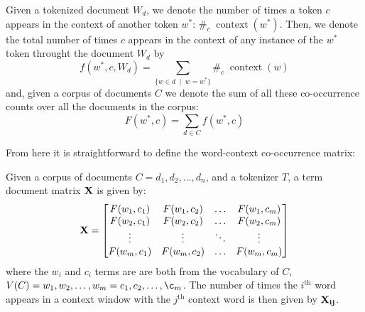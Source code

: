 \begin{definition}
  Given a tokenized document $W_d$, we denote the number of times a token $c$ appears in the context of another token $w^*$: $\#_c\;\operatorname{context}(w^*)$. Then, we denote the total number of times $c$ appears in the context of any instance of the $w^*$ token throught the document $W_d$ by
  \begin{equation}
    f(w^*,c,W_d)=\sum_{\{w\in d\;\mid\; w=w^*\}}\#_c\;\operatorname{context}(w)
  \end{equation}
  and, given a corpus of documents $C$ we denote the sum of all these co-occurrence counts over all the documents in the corpus:
  \begin{equation}
    F(w^*,c)=\sum_{d\in C}f(w^*,c)
  \end{equation}
\end{definition}

From here it is straightforward to define the word-context co-occurrence matrix:

\begin{definition}
  Given a corpus of documents $C=d_1,d_2,\dots,d_n$, and a tokenizer $T$, a term document matrix $\bf{X}$ is given by:
  \begin{equation}
    \bf{X}=
  \begin{bmatrix}
    F(w_1,c_1) & F(w_1,c_2) & \dots  & F(w_1,c_m) \\
    F(w_2,c_1) & F(w_2,c_2) & \dots  & F(w_2,c_m) \\
    \vdots        & \vdots        & \ddots & \vdots          \\
    F(w_m,c_1) & F(w_m,c_2) & \dots  & F(w_m,c_m) \\
  \end{bmatrix}
  \end{equation}
  where the $w_i$ and $c_i$ terms are are both from the vocabulary of $C$, $V(C)=w_1,w_2,\dots,w_m=c_1,c_2,\dots,\c_m$.
  The number of times the $i^{\text{th}}$ word appears in a context window with the $j^{\text{th}}$ context word is then given by $\bf{X}_{ij}$.
\end{definition}

